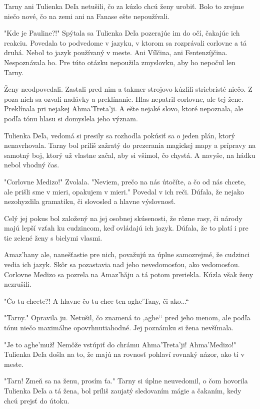 \documentclass{book}
\begin{document}
Tarny ani Tulienka Deľa netušili, čo za kúzlo chcú ženy urobiť. Bolo to zrejme niečo nové, čo na zemi ani na Fanase ešte nepoužívali.

"$ $Kde je Pauline?!"$ $ Spýtala sa Tulienka Deľa pozerajúc im do očí, čakajúc ich reakciu. Povedala to podvedome v jazyku, v ktorom sa rozprávali corlovne a tá druhá. Nebol to jazyk používaný v meste. Ani Vílčina, ani Fentenzíjčina. Nespoznávala ho. Pre túto otázku nepoužila zmyslovku, aby ho nepočul len Tarny.

Ženy neodpovedali. Zastali pred nim a takmer strojovo kúzlili striebristé niečo. Z poza nich sa ozvali nadávky a preklínanie. Hlas nepatril corlovne, ale tej žene. Preklínala pri nejakej Ahma'Treta'ji. A ešte nejaké slovo, ktoré nepoznala, ale podľa tónu hlasu si domyslela jeho význam.

Tulienka Deľa, vedomá si presily sa rozhodla pokúsiť sa o jeden plán, ktorý nenavrhovala. Tarny bol príliš zažratý do prezerania magickej mapy a prípravy na samotný boj, ktorý už vlastne začal, aby si všimol, čo chystá. A navyše, na hádku nebol vhodný čas.

"$ $Corlovne Medizo!"$ $ Zvolala. "$ $Neviem, prečo na nás útočíte, a čo od nás chcete, ale prišli sme v mieri, opakujem v mieri."$ $ Povedal v ich reči. Dúfala, že nejako nezohyzdila gramatiku, či slovosled a hlavne výslovnosť.

Celý jej pokus bol založený na jej osobnej skúsenosti, že rôzne rasy, či národy majú lepší vzťah ku cudzincom, keď ovládajú ich jazyk. Dúfala, že to platí i pre tie zelené ženy s bielymi vlasmi.

Amaz'hany ale, nanešťastie pre nich, považujú za úplne samozrejmé, že cudzinci vedia ich jazyk. Skôr sa pozastavia nad jeho nevedomosťou, ako vedomosťou. Corlovne Medizo sa pozrela na Amaz'ha\v{}ju a tá potom preriekla. Kúzla však ženy nezrušili.

"$ $Čo tu chcete?! A hlavne čo tu chce ten aghe'Tany, či ako...“

"$ $Tarny."$ $ Opravila ju. Netušil, čo znamená to ‚aghe‘‘ pred jeho menom, ale podľa tónu niečo maximálne opovrhnutiahodné. Jej poznámku si žena nevšímala.

"$ $Je to aghe'muž! Nemôže vstúpiť do chrámu Ahma'Treta'ji! Ahma'Medizo!"$ $ Tulienka Deľa došla na to, že majú na rovnosť pohlaví rovnaký názor, ako tí v meste.

"$ $Tarn! Zmeň sa na ženu, prosím ťa."$ $ Tarny si úplne neuvedomil, o čom hovorila Tulienka Deľa a tá žena, bol príliš zaujatý sledovaním mágie a čakaním, kedy chcú prejsť do útoku.
\end{document}
